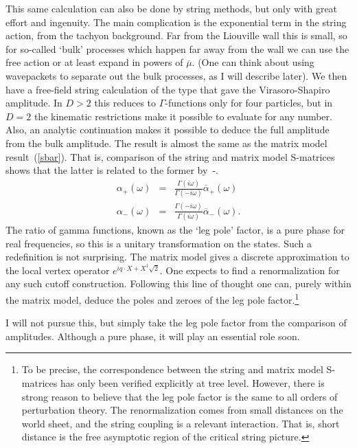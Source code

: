 This same calculation can also be done by string methods, but only with
great effort and ingenuity.  The main complication is the exponential
term in the string action, from the tachyon background.  Far from the
Liouville wall this is small, so for so-called `bulk' processes which
happen far away from the wall we can use the free action or at least
expand in powers of $\overline\mu$.  (One can think about using
wavepackets to separate out the bulk processes, as I will describe
later).  We then have a free-field string calculation of the type
that gave the Virasoro-Shapiro amplitude.  In $D > 2$ this reduces
to $\Gamma$-functions only for four particles, but in $D = 2$ the
kinematic restrictions make it possible to evaluate for any number.
Also, an analytic continuation makes it possible to deduce the full
amplitude from the bulk amplitude.  The result is almost the same as
the matrix model result~(\ref{sbar}).  That is, comparison of the
string and matrix model S-matrices shows that the latter is related
to the former by~\cite{dFK}-\cite{GKs1c1}.
\begin{eqnarray}
\alpha_+(\omega) &=& 
\frac{\Gamma(i \omega )}{\Gamma(-i \omega )}
\overline\alpha_+(\omega) \nonumber\\
\alpha_-(\omega) &=& 
\frac{\Gamma(-i \omega )}{\Gamma(i \omega )}
\overline\alpha_-(\omega).  \label{tachren}
\end{eqnarray}
The ratio of gamma functions, known as the `leg pole' factor, is a
pure phase for real frequencies, so this is a unitary transformation
on the states.  Such a redefinition is not surprising.  The matrix
model gives a discrete approximation to the local vertex operator
$e^{i q \cdot X + X^1 \sqrt 2}$.  One expects to find a
renormalization for any such cutoff construction.  Following this
line of thought one can, purely within the matrix model, deduce the
poles and zeroes of the leg pole factor.\footnote
{To be precise, the correspondence between the string and matrix
model S-matrices has only been verified explicitly at tree level. 
However, there is strong reason to believe that the leg pole factor
is the same to all orders of perturbation theory. The
renormalization comes from small distances on the world sheet, and
the string coupling is a relevant interaction.  That is, short
distance is the free asymptotic region of the critical string
picture.}

 I will not pursue this,
but simply take the leg pole factor from the comparison of
amplitudes.  Although a pure phase, it will play an essential role
soon.

